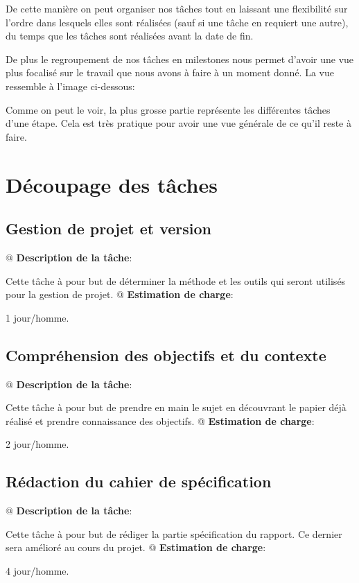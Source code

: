 \documentclass[final]{polytech/polytech}
\begin{document}
		De cette manière on peut organiser nos tâches tout en laissant une flexibilité sur l'ordre dans lesquels elles sont réalisées (sauf si une tâche en requiert une autre), du temps que les tâches sont réalisées avant la date de fin.
		
		De plus le regroupement de nos tâches en milestones nous permet d'avoir une vue plus focalisé sur le travail que nous avons à faire à un moment donné.
		La vue ressemble à l'image ci-dessous:
		
		Comme on peut le voir, la plus grosse partie représente les différentes tâches d'une étape. Cela est très pratique pour avoir une vue générale de ce qu'il reste à faire.
	
	\section{Découpage des tâches}
		\subsection{Gestion de projet et version}
			\begin{easylist}
				@ \textbf{Description de la tâche}:
				
				Cette tâche à pour but de déterminer la méthode et les outils qui seront utilisés pour la gestion de projet.
				@ \textbf{Estimation de charge}:
				
				1 jour/homme.
			\end{easylist}
			
		\subsection{Compréhension des objectifs et du contexte}
			\begin{easylist}
				@ \textbf{Description de la tâche}:
				
				Cette tâche à pour but de prendre en main le sujet en découvrant le papier déjà réalisé et prendre connaissance des objectifs.
				@ \textbf{Estimation de charge}:
				
				2 jour/homme.
			\end{easylist}
			
		\subsection{Rédaction du cahier de spécification}
			\begin{easylist}
				@ \textbf{Description de la tâche}:
				
				Cette tâche à pour but de rédiger la partie spécification du rapport. Ce dernier sera amélioré au cours du projet.
				@ \textbf{Estimation de charge}:
				
				4 jour/homme.
			\end{easylist}
			
\end{document}
